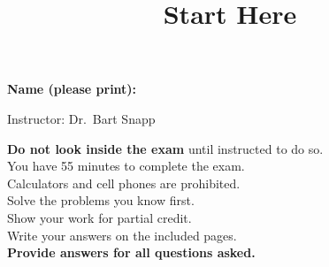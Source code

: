 \documentclass{ximera}
\title{Start Here}
\begin{document}
\begin{abstract}
\end{abstract}
\maketitle


\thispagestyle{empty}


\vfill

\noindent\textsf{\Large \textbf{Name (please print):}}\hrulefill



\noindent\textsf{\large Instructor: Dr.\ Bart Snapp}


\vspace{1cm}

{\Large
  \noindent \textbf{Do not look inside the exam} until instructed to do so.\\[1em]
\noindent You have 55 minutes to complete the exam.\\[1em]
\noindent Calculators and cell phones are prohibited.\\[1em]
\noindent Solve the problems you know first.\\[1em]
\noindent Show your work for partial credit.\\[1em]
\noindent Write your answers on the included pages.\\[1em]
\noindent \textbf{Provide answers for all questions asked.}
}
\end{document}
